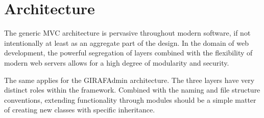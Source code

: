 \section{Architecture}
The generic MVC architecture is pervasive throughout modern software, if not intentionally at least as an aggregate part of the design. In the domain of web development, the powerful segregation of layers combined with the flexibility of modern web servers allows for a high degree of modularity and security.

The same applies for the GIRAFAdmin architecture. The three layers have very distinct roles within the framework. Combined with the naming and file structure conventions, extending functionality through modules should be a simple matter of creating new classes with specific inheritance.
